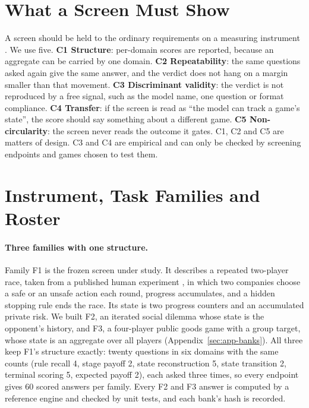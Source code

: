 \documentclass[11pt]{article}
\begin{document}
\section{What a Screen Must Show}
\label{sec:criteria}

A screen should be held to the ordinary requirements on a measuring
instrument \citep{jacobs2021measurement,salaudeen2025measurement}. We use five.
\textbf{C1 Structure}: per-domain scores are reported, because an aggregate can
be carried by one domain. \textbf{C2 Repeatability}: the same questions asked
again give the same answer, and the verdict does not hang on a margin smaller
than that movement. \textbf{C3 Discriminant validity}: the verdict is not
reproduced by a free signal, such as the model name, one question or format
compliance. \textbf{C4 Transfer}: if the screen is read as ``the model can
track a game's state'', the score should say something about a different game.
\textbf{C5 Non-circularity}: the screen never reads the outcome it gates. C1,
C2 and C5 are matters of design. C3 and C4 are empirical and can only be
checked by screening endpoints and games chosen to test them.

\section{Instrument, Task Families and Roster}
\label{sec:design}

\paragraph{Three families with one structure.}
Family F1 is the frozen screen under study. It describes a repeated two-player
race, taken from a published human experiment \citep{falling_behind_unsafe},
in which two companies choose a safe or an unsafe action each round, progress
accumulates, and a hidden stopping rule ends the race. Its state is two
progress counters and an accumulated private risk. We built F2, an iterated
social dilemma whose state is the opponent's history, and F3, a four-player
public goods game with a group target, whose state is an aggregate over all
players (Appendix~\ref{sec:app-banks}). All three keep F1's structure exactly:
twenty questions in six domains with the same counts (rule recall 4, stage
payoff 2, state reconstruction 5, state transition 2, terminal scoring 5,
expected payoff 2), each asked three times, so every endpoint gives 60 scored
answers per family. Every F2 and F3 answer is computed by a reference engine
and checked by unit tests, and each bank's hash is recorded.
\end{document}
